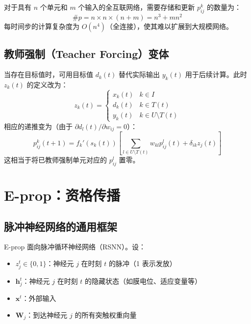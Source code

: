\documentclass{article}
\begin{document}
对于具有 $n$ 个单元和 $m$ 个输入的全互联网络，需要存储和更新 $p_{ij}^k$ 的数量为：
\begin{equation}
\text{\#} p = n \times n \times (n+m) = n^3 + m n^2
\label{eq:rtrl_complexity}
\end{equation}
每时间步的计算复杂度为 $O(n^4)$（全连接），使其难以扩展到大规模网络。

\subsection{教师强制（Teacher Forcing）变体}

当存在目标值时，可用目标值 $d_k(t)$ 替代实际输出 $y_k(t)$ 用于后续计算。此时 $z_k(t)$ 的定义改为：
\begin{equation}
z_k(t) = 
\begin{cases}
x_k(t) & k \in I \\
d_k(t) & k \in T(t) \\
y_k(t) & k \in U \setminus T(t)
\end{cases}
\label{eq:rtrl_tf_z}
\end{equation}
相应的递推变为（由于 $\partial d_l(t) / \partial w_{ij} = 0$）：
\begin{equation}
p_{ij}^k(t+1) = f_k'(s_k(t)) \left[ \sum_{l \in U \setminus T(t)} w_{kl} p_{ij}^l(t) + \delta_{ik} z_j(t) \right]
\label{eq:rtrl_tf_rec}
\end{equation}
这相当于将已教师强制单元对应的 $p_{ij}^l$ 置零。

\section{E-prop：资格传播}

\subsection{脉冲神经网络的通用框架}

E-prop 面向脉冲循环神经网络（RSNN）。设：
\begin{itemize}
    \item $z_j^t \in \{0,1\}$：神经元 $j$ 在时刻 $t$ 的脉冲（1 表示发放）
    \item $\mathbf{h}_j^t$：神经元 $j$ 在时刻 $t$ 的隐藏状态（如膜电位、适应变量等）
    \item $\mathbf{x}^t$：外部输入
    \item $\mathbf{W}_j$：到达神经元 $j$ 的所有突触权重向量
\end{itemize}
\end{document}
